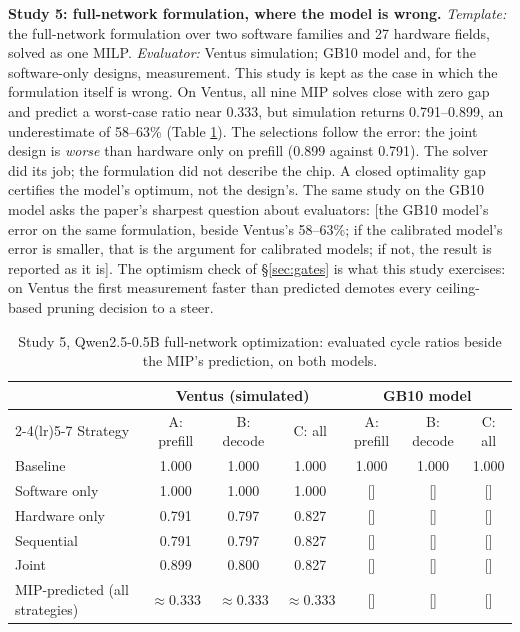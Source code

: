 \documentclass[11pt]{article}
\newcommand{\pending}[1]{\textcolor{red!65!black}{[#1]}}
\begin{document}
\textbf{Study 5: full-network formulation, where the model is wrong.} \emph{Template:} the full-network formulation over two software families and 27 hardware fields, solved as one MILP. \emph{Evaluator:} Ventus simulation; GB10 model and, for the software-only designs, measurement. This study is kept as the case in which the formulation itself is wrong. On Ventus, all nine MIP solves close with zero gap and predict a worst-case ratio near 0.333, but simulation returns 0.791--0.899, an underestimate of 58--63\% (Table \ref{tab:study5}). The selections follow the error: the joint design is \emph{worse} than hardware only on prefill (0.899 against 0.791). The solver did its job; the formulation did not describe the chip. A closed optimality gap certifies the model's optimum, not the design's. The same study on the GB10 model asks the paper's sharpest question about evaluators: \pending{the GB10 model's error on the same formulation, beside Ventus's 58--63\%; if the calibrated model's error is smaller, that is the argument for calibrated models; if not, the result is reported as it is}. The optimism check of §\ref{sec:gates} is what this study exercises: on Ventus the first measurement faster than predicted demotes every ceiling-based pruning decision to a steer.

\begin{table}[tb]
\small
\centering
\begin{tabular}{@{}l ccc ccc@{}}
\toprule
 & \multicolumn{3}{c}{Ventus (simulated)} & \multicolumn{3}{c}{GB10 model} \\
\cmidrule(lr){2-4}\cmidrule(lr){5-7}
Strategy & A: prefill & B: decode & C: all & A: prefill & B: decode & C: all \\
\midrule
Baseline & 1.000 & 1.000 & 1.000 & 1.000 & 1.000 & 1.000 \\
Software only & 1.000 & 1.000 & 1.000 & \pending{} & \pending{} & \pending{} \\
Hardware only & 0.791 & 0.797 & 0.827 & \pending{} & \pending{} & \pending{} \\
Sequential & 0.791 & 0.797 & 0.827 & \pending{} & \pending{} & \pending{} \\
Joint & 0.899 & 0.800 & 0.827 & \pending{} & \pending{} & \pending{} \\
MIP-predicted (all strategies) & \(\approx 0.333\) & \(\approx 0.333\) & \(\approx 0.333\) & \pending{} & \pending{} & \pending{} \\
\bottomrule
\end{tabular}
\caption{Study 5, Qwen2.5-0.5B full-network optimization: evaluated cycle ratios beside the MIP's prediction, on both models.}
\label{tab:study5}
\end{table}
\end{document}
